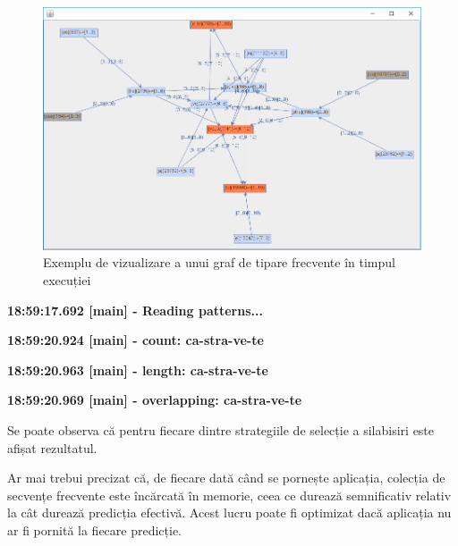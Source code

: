 \begin{figure}[h!]
    \centering
    \includegraphics[width=1.0\textwidth]{figures/rosil-castravete.png}
    \caption{Exemplu de vizualizare a unui graf de tipare frecvente în timpul execuției}
    \label{fig:rosil-service}
\end{figure}


\textbf{18:59:17.692 [main] - Reading patterns...}

\textbf{18:59:20.924 [main] - count: ca-stra-ve-te}

\textbf{18:59:20.963 [main] - length: ca-stra-ve-te}

\textbf{18:59:20.969 [main] - overlapping: ca-stra-ve-te}

Se poate observa că pentru fiecare dintre strategiile de selecție a silabisiri este afișat rezultatul. 

Ar mai trebui precizat că, de fiecare dată când se pornește aplicația, colecția de secvențe frecvente este încărcată în memorie, ceea ce durează semnificativ relativ la cât durează predicția efectivă. Acest lucru poate fi optimizat dacă aplicația nu ar fi pornită la fiecare predicție.

